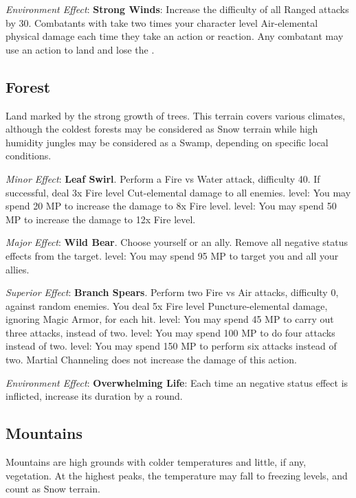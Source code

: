 \begin{multicols}{2}
\textit{Environment Effect}: \textbf{Strong Winds}: Increase the difficulty of all Ranged attacks by 30. Combatants with  take two times your character level Air-elemental physical damage each time they take an action or reaction. Any combatant may use an action to land and lose the . 

\subsection*{Forest}\label{subsec:geo-forest}
Land marked by the strong growth of trees. This terrain covers various climates, although the coldest forests may be considered as Snow terrain while high humidity jungles may be considered as a Swamp, depending on specific local conditions.

\textit{Minor Effect}: \textbf{Leaf Swirl}. Perform a Fire vs Water attack, difficulty 40. If successful, deal 3x Fire level Cut-elemental damage to all enemies.  level: You may spend 20 MP to increase the damage to 8x Fire level.  level: You may spend 50 MP to increase the damage to 12x Fire level.

\textit{Major Effect}: \textbf{Wild Bear}. Choose yourself or an ally. Remove all negative status effects from the target.  level: You may spend 95 MP to target you and all your allies.

\textit{Superior Effect}: \textbf{Branch Spears}. Perform two Fire vs Air attacks, difficulty 0, against random enemies. You deal 5x Fire level Puncture-elemental damage, ignoring Magic Armor, for each hit.  level: You may spend 45 MP to carry out three attacks, instead of two.  level: You may spend 100 MP to do four attacks instead of two.  level: You may spend 150 MP to perform six attacks instead of two. Martial Channeling does not increase the damage of this action.

\textit{Environment Effect}: \textbf{Overwhelming Life}: Each time an negative status effect is inflicted, increase its duration by a round. 

\subsection*{Mountains}\label{subsec:geo-mountain}
Mountains are high grounds with colder temperatures and little, if any, vegetation. At the highest peaks, the temperature may fall to freezing levels, and count as Snow terrain.


\end{multicols}
